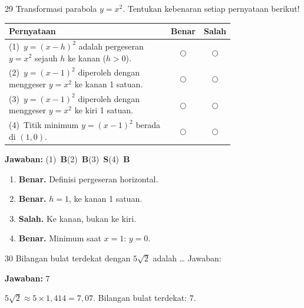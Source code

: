 \documentclass[11pt]{article}
\newcommand{\jawaban}[1]{%
  \noindent\colorbox{gold!30}{\parbox{\dimexpr\linewidth-2\fboxsep\relax}{%
    \textbf{Jawaban:} #1}}\par\smallskip}
\begin{document}
\begin{soal}{29}
Transformasi parabola $y=x^2$.
Tentukan kebenaran setiap pernyataan berikut!

\par\smallskip
{\renewcommand{\arraystretch}{1.4}%
\begin{tabular}{@{}p{0.76\linewidth}cc@{}}
\hline\textbf{Pernyataan}&\textbf{Benar}&\textbf{Salah}\\\hline
(1)~$y=(x-h)^2$ adalah pergeseran $y=x^2$ sejauh $h$ ke kanan ($h>0$).&$\bigcirc$&$\bigcirc$\\
(2)~$y=(x-1)^2$ diperoleh dengan menggeser $y=x^2$ ke kanan 1 satuan.&$\bigcirc$&$\bigcirc$\\
(3)~$y=(x-1)^2$ diperoleh dengan menggeser $y=x^2$ ke kiri 1 satuan.&$\bigcirc$&$\bigcirc$\\
(4)~Titik minimum $y=(x-1)^2$ berada di $(1,0)$.&$\bigcirc$&$\bigcirc$\\\hline
\end{tabular}}
\end{soal}
\begin{pembox}
\jawaban{(1)~\textbf{B}\quad(2)~\textbf{B}\quad(3)~\textbf{S}\quad(4)~\textbf{B}}
\begin{enumerate}[leftmargin=*,topsep=2pt,itemsep=2pt]
\item \textbf{Benar.} Definisi pergeseran horizontal.
\item \textbf{Benar.} $h=1$, ke kanan 1 satuan.
\item \textbf{Salah.} Ke kanan, bukan ke kiri.
\item \textbf{Benar.} Minimum saat $x=1$: $y=0$.
\end{enumerate}
\end{pembox}

\begin{soal}{30}
Bilangan bulat terdekat dengan $5\sqrt{2}$ adalah \ldots\hfill
Jawaban:\enspace\underline{\hspace{3cm}}
\end{soal}
\begin{pembox}
\jawaban{$7$}
$5\sqrt{2}\approx5\times1{,}414=7{,}07$. Bilangan bulat terdekat: $7$.
\end{pembox}

\end{document}
